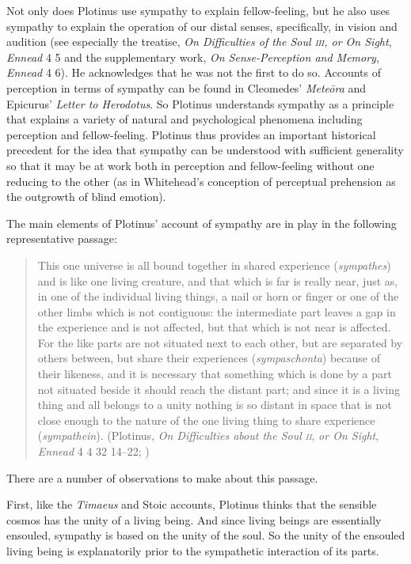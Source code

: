 Not only does Plotinus use sympathy to explain fellow-feeling, but he also uses sympathy to explain the operation of our distal senses, specifically, in vision and audition (see especially the treatise, \emph{On Difficulties of the Soul \textsc{iii}, or On Sight}, \emph{Ennead} 4 5 and the supplementary work, \emph{On Sense-Perception and Memory}, \emph{Ennead} 4 6). He acknowledges that he was not the first to do so. Accounts of perception in terms of sympathy can be found in Cleomedes' \emph{Meteōra} and Epicurus' \emph{Letter to Herodotus}. So Plotinus understands sympathy as a principle that explains a variety of natural and psychological phenomena including perception and fellow-feeling. Plotinus thus provides an important historical precedent for the idea that sympathy can be understood with sufficient generality so that it may be at work both in perception and fellow-feeling without one reducing to the other (as in Whitehead's \citeyear{Whitehead:1978zr} conception of perceptual prehension as the outgrowth of blind emotion).

The main elements of Plotinus' account of sympathy are in play in the following representative passage:
\begin{quote}
	This one universe is all bound together in shared experience (\emph{sympathes}) and is like one living creature, and that which is far is really near, just as, in one of the individual living things, a nail or horn or finger or one of the other limbs which is not contiguous: the intermediate part leaves a gap in the experience and is not affected, but that which is not near is affected. For the like parts are not situated next to each other, but are separated by others between, but share their experiences (\emph{sympaschonta}) because of their likeness, and it is necessary that something which is done by a part not situated beside it should reach the distant part; and since it is a living thing and all belongs to a unity nothing is so distant in space that is not close enough to the nature of the one living thing to share experience (\emph{sympathein}). (Plotinus, \emph{On Difficulties about the Soul \textsc{ii}}, \emph{or On Sight}, \emph{Ennead} 4 4 32 14--22; \citealt[235--7]{Armstrong:1984aa})
\end{quote}
There are a number of observations to make about this passage.

First, like the \emph{Timaeus} and Stoic accounts, Plotinus thinks that the sensible cosmos has the unity of a living being. And since living beings are essentially ensouled, sympathy is based on the unity of the soul. So the unity of the ensouled living being is explanatorily prior to the sympathetic interaction of its parts.

